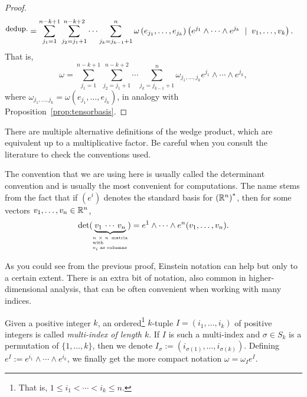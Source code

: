 \begin{proof}
\begin{align}
    \overset{\mbox{\small dedup.}}{}
    &= \sum_{j_1=1}^{n-k+1}\sum_{j_2=j_1+1}^{n-k+2}\cdots \sum_{j_k=j_{k-1}+1}^{n} \omega\left(e_{j_1}, \ldots, e_{j_k}\right) \left(e^{j_1}\wedge \cdots \wedge e^{j_k} \;\mid\; v_1, \ldots, v_k\right).
  \end{align}
  That is,
  \begin{equation}
    \omega = \sum_{j_1=1}^{n-k+1}\sum_{j_2=j_1+1}^{n-k+2}\cdots \sum_{j_k=j_{k-1}+1}^{n} \omega_{j_1, \ldots, j_k} e^{j_1}\wedge \cdots \wedge e^{j_k},
  \end{equation}
  where $\omega_{j_1, \ldots, j_k} = \omega\left(e_{j_1}, \ldots, e_{j_k}\right)$, in analogy with Proposition~\ref{prop:tensorbasis}.
\end{proof}

\begin{remark}
  There are multiple alternative definitions of the wedge product, which are equivalent up to a multiplicative factor.
  Be careful when you consult the literature to check the conventions used.

  The convention that we are using here is usually called the determinant convention and is usually the most convenient for computations. The name stems from the fact that if $(e^i)$ denotes the standard basis for ${(\mathbb{R}^n)}^*$, then for some vectors $v_1, \ldots, v_n \in\mathbb{R}^n$,
  \begin{equation}
    \det(\LaTeXunderbrace{v_1 \,\cdots\, v_n}_{\parbox{1.5cm}{\tiny $n\times n$ matrix with\\$v_i$ as columns}}) = e^1\wedge\cdots\wedge e^n(v_1,\ldots,v_n).
  \end{equation}
\end{remark}

As you could see from the previous proof, Einstein notation can help but only to a certain extent.
There is an extra bit of notation, also common in higher-dimensional analysis, that can be often convenient when working with many indices.
\begin{notation}
  Given a positive integer $k$, an ordered\footnote{That is, $1\leq i_1<\cdots<i_k\leq n$.} $k$-tuple $I=(i_1, \ldots, i_k)$ of positive integers is called \emph{multi-index of length $k$}.
  If $I$ is such a multi-index and $\sigma\in S_k$ is a permutation of $\{1,\ldots,k\}$, then we denote $I_\sigma := (i_{\sigma(1)}, \ldots, i_{\sigma(k)})$.
  Defining $e^I := e^{i_1}\wedge\cdots\wedge e^{i_k}$, we finally get the more compact notation $\omega = \omega_I e^I$.
\end{notation}

